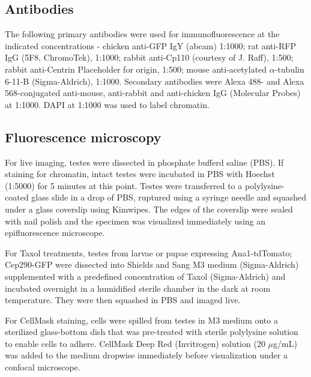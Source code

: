 \documentclass[12pt, twoside, letterpaper]{article}
\begin{document}
\begin{doublespacing}
\begin{linenumbers}
    \subsection{Antibodies}
    The following primary antibodies were used for immunofluorescence
    at the indicated concentrations -
    chicken anti-GFP IgY (abcam) 1:1000;
    rat anti-RFP IgG (5F8, ChromoTek), 1:1000;
    rabbit anti-Cp110 (courtesy of J. Raff), 1:500;
    rabbit anti-Centrin {Placeholder for origin}, 1:500;
    mouse anti-acetylated $\alpha$-tubulin 6-11-B (Sigma-Aldrich), 1:1000.
    Secondary antibodies were Alexa 488- and Alexa 568-conjugated
    anti-mouse, anti-rabbit and anti-chicken
    IgG (Molecular Probes) at 1:1000.
    DAPI at 1:1000 was used to label chromatin.

    \subsection{Fluorescence microscopy}
    For live imaging, testes were dissected in phosphate bufferd saline (PBS).
    If staining for chromatin, intact testes were incubated in PBS with
    Hoechst (1:5000) for 5 minutes at this point.
    Testes were transferred to a polylysine-coated glass slide in a drop of PBS,
    ruptured using a syringe needle and
    squashed under a glass coverslip using Kimwipes.
    The edges of the coverslip were sealed with nail polish
    and the specimen was visualized immediately using an epifluorescence microscope.

    For Taxol treatments, testes from larvae or pupae expressing
    Ana1-tdTomato; Cep290-GFP were
    dissected into Shields and Sang M3 medium (Sigma-Aldrich) supplemented
    with a predefined
    concentration of Taxol (Sigma-Aldrich)
    and incubated overnight in a humidified sterile
    chamber in the dark at room temperature. They were then squashed
    in PBS and imaged live.

    For CellMask staining, cells were spilled from testes in M3 medium onto
    a sterilized glass-bottom dish that was pre-treated with sterile polylysine solution
    to enable cells to adhere.
    CellMask Deep Red (Invitrogen) solution (20 $\mu$g/mL) was added to the medium dropwise
    immediately before visualization under a confocal microscope.


\end{linenumbers}
\end{doublespacing}
\end{document}
